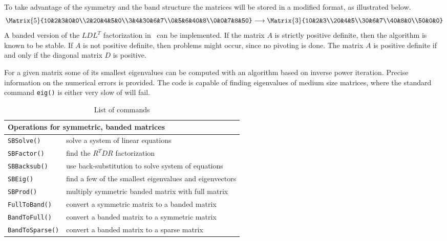 \documentclass[11pt]{article}
\begin{document}
To take advantage of the symmetry and the band structure the matrices will
be stored in a modified format, as illustrated below.
\[\Matrix{5}{10&2&3&0&0\\2&20&4&5&0\\3&4&30&6&7\\0&5&6&40&8\\0&0&7&8&50}
\longrightarrow
\Matrix{3}{10&2&3\\20&4&5\\30&6&7\\40&8&0\\50&0&0}\]
A banded version of the $LDL^T$ factorization in~\cite{GoluVanLoan96}
can be implemented. If the matrix $A$ is strictly positive definite, then
the algorithm is known to be stable. If $A$ is not positive definite, then
problems might occur, since no pivoting is done. The matrix $A$ is
positive definite if and only if the diagonal matrix $D$ is positive.

For a given matrix some of its smallest eigenvalues can be computed with an
algorithm based on inverse power iteration. Precise information on the
numerical errors is provided. The code is capable of finding eigenvalues of
medium size matrices, where the standard command \texttt{eig()} is either very
slow of will fail.


\begin{table}[htbp]
  \begin{center}
\begin{tabular}{|l|l|}\hline
\multicolumn{2}{|l|}{Operations for symmetric, banded matrices}\\\hline
\texttt{SBSolve()} & solve a system of linear equations \\
\texttt{SBFactor()} & find the $R^TDR$ factorization \\
\texttt{SBBacksub()} & use back-substitution to solve system of equations\\
\texttt{SBEig()} & find a few of the smallest eigenvalues and eigenvectors\\
\texttt{SBProd()} & multiply symmetric banded matrix with full matrix\\
\texttt{FullToBand()} & convert a symmetric matrix to a banded matrix\\
\texttt{BandToFull()} & convert a banded matrix to a symmetric matrix\\
\texttt{BandToSparse()} & convert a banded matrix to a sparse matrix\\
\hline\end{tabular}
    \caption{List of commands}
    \label{tab:commands}
  \end{center}
\end{table}
\begin{center}
\end{center}
\end{document}
